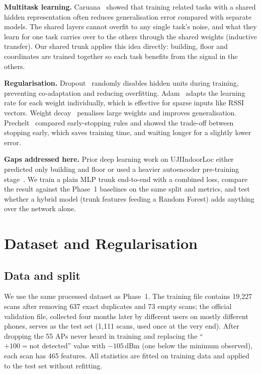 \documentclass[conference]{IEEEtran}
\begin{document}
\textbf{Multitask learning.}
Caruana~\cite{caruana1997mtl} showed that training related tasks with a shared hidden
representation often reduces generalisation error compared with separate models. The shared
layers cannot overfit to any single task's noise, and what they learn for one task carries over to
the others through the shared weights (inductive transfer). Our shared trunk applies this idea
directly: building, floor and coordinates are trained together so each task benefits from the
signal in the others.

\textbf{Regularisation.}
Dropout~\cite{srivastava2014dropout} randomly disables hidden units during training, preventing
co-adaptation and reducing overfitting. Adam~\cite{kingma2015adam} adapts the learning rate for
each weight individually, which is effective for sparse inputs like RSSI vectors.
Weight decay~\cite{krogh1992weight} penalises large weights and improves generalisation.
Prechelt~\cite{prechelt1998early} compared early-stopping rules and showed the trade-off between
stopping early, which saves training time, and waiting longer for a slightly lower error.

\textbf{Gaps addressed here.}
Prior deep learning work on UJIIndoorLoc either predicted only building and floor
\cite{nowicki2017lowEffort} or used a heavier autoencoder pre-training
stage~\cite{kim2018scalable,song2019cnnloc}. We train a plain MLP trunk end-to-end with a
combined loss, compare the result against the Phase~1 baselines on the same split and metrics,
and test whether a hybrid model (trunk features feeding a Random Forest) adds anything over the
network alone.

\section{Dataset and Regularisation}

\subsection{Data and split}

We use the same processed dataset as Phase~1. The training file contains 19{,}227 scans after
removing 637 exact duplicates and 73 empty scans; the official validation file, collected four
months later by different users on mostly different phones, serves as the test set (1{,}111 scans,
used once at the very end). After dropping the 55 APs never heard in training and replacing the
``$+100 = \text{not detected}$'' value with $-105$\,dBm (one below the minimum observed), each
scan has 465 features. All statistics are fitted on training data and applied to the test set
without refitting.
\end{document}
